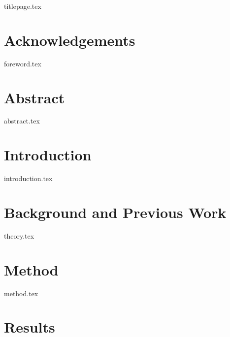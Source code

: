 \documentclass[12pt, a4paper]{report}
\begin{document}
{titlepage.tex}

\chapter*{Acknowledgements}
{foreword.tex}

\chapter*{Abstract}
{abstract.tex}

\tableofcontents
\newpage


\chapter{Introduction}
{introduction.tex}


\chapter{Background and Previous Work}
{theory.tex}

\chapter{Method}
{method.tex}

\chapter{Results}
\end{document}
